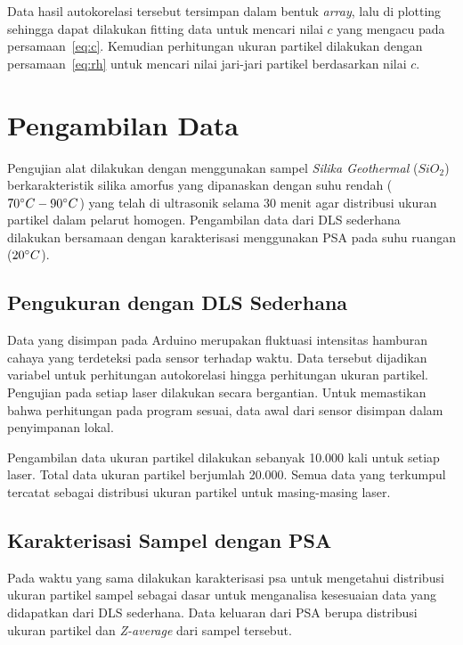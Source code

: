Data hasil autokorelasi tersebut tersimpan dalam bentuk
\textit{array}, lalu di plotting sehingga dapat dilakukan fitting data untuk mencari nilai
${c}$ yang mengacu pada persamaan~\ref{eq:c}. Kemudian perhitungan ukuran partikel
dilakukan dengan persamaan~\ref{eq:rh} untuk mencari nilai jari-jari partikel
berdasarkan nilai ${c}$.


\section{Pengambilan Data}
Pengujian alat dilakukan dengan menggunakan sampel \textit{Silika Geothermal} (${SiO_2}$)
\cite{MadeJoni2020} berkarakteristik silika amorfus yang dipanaskan dengan suhu rendah
(${70\degree C - 90\degree C}$) yang
telah di ultrasonik selama 30 menit agar distribusi ukuran partikel dalam pelarut homogen.
Pengambilan data dari DLS sederhana dilakukan bersamaan dengan karakterisasi menggunakan PSA
pada suhu ruangan (${20\degree C}$).

\subsection{Pengukuran dengan DLS Sederhana}
Data yang disimpan pada Arduino merupakan fluktuasi intensitas hamburan cahaya yang terdeteksi
pada sensor terhadap waktu. Data tersebut dijadikan variabel untuk perhitungan autokorelasi
hingga perhitungan ukuran partikel. Pengujian pada setiap laser dilakukan secara bergantian.
Untuk memastikan bahwa perhitungan pada program sesuai, data awal dari sensor disimpan dalam
penyimpanan lokal.

Pengambilan data ukuran partikel dilakukan sebanyak 10.000 kali untuk setiap laser. Total data
ukuran partikel berjumlah 20.000. Semua data yang terkumpul tercatat sebagai distribusi
ukuran partikel untuk masing-masing laser.

\subsection{Karakterisasi Sampel dengan PSA}
Pada waktu yang sama dilakukan karakterisasi psa untuk mengetahui distribusi ukuran partikel
sampel sebagai dasar untuk menganalisa kesesuaian data yang didapatkan dari DLS sederhana.
Data keluaran dari PSA berupa distribusi ukuran partikel dan \textit{Z-average} dari sampel
tersebut.
